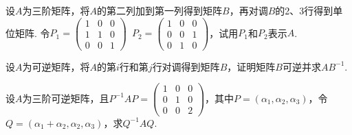 \begin{exercise}

    \begin{exgroup}
        \item 设$A$为三阶矩阵，将$A$的第二列加到第一列得到矩阵$B$，再对调$B$的2、3行得到单位矩阵. 令$P_1=\begin{pmatrix}1 & 0 & 0 \\ 1 & 1 & 0 \\ 0 & 0 & 1\end{pmatrix}\enspace P_2=\begin{pmatrix}1 & 0 & 0 \\ 0 & 0 & 1 \\ 0 & 1 & 0\end{pmatrix}$，试用$P_1$和$P_2$表示$A$.

        \item 设$A$为可逆矩阵，将$A$的第$i$行和第$j$行对调得到矩阵$B$，证明矩阵$B$可逆并求$AB^{-1}$.

        \item 设$A$为三阶可逆矩阵，且$P^{-1}AP=\begin{pmatrix}1 & 0 & 0 \\ 0 & 1 & 0 \\ 0 & 0 & 2\end{pmatrix}$，其中$P=(\alpha_1,\alpha_2,\alpha_3)$，令$Q=(\alpha_1+\alpha_2,\alpha_2,\alpha_3)$，求$Q^{-1}AQ$.


\end{exgroup}
\end{exercise}
